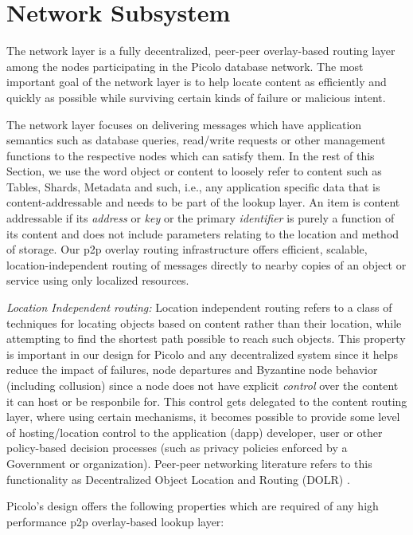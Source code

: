 \section{Network Subsystem} 

The network layer is a fully decentralized, peer-peer overlay-based routing layer among the nodes participating in the
Picolo database network. The most important goal of the network layer is to help locate content as efficiently and
quickly as possible while surviving certain kinds of failure or malicious intent.

The network layer focuses on delivering messages which have application semantics such as database queries, read/write
requests or other management functions to the respective nodes which can satisfy them. In the rest of this Section, we
use the word object or content to loosely refer to content such as Tables, Shards, Metadata and such, i.e., any
application specific data that is content-addressable and needs to be part of the lookup layer. An item is content
addressable if its {\em address} or {\em key} or the primary {\em identifier} is purely a function of its content and
does not include parameters relating to the location and method of storage. Our p2p overlay routing infrastructure offers
efficient, scalable, location-independent routing of messages directly to nearby copies of an object or service using
only localized resources.

{\em Location Independent routing:} Location independent routing refers to a class of techniques for locating objects
based on content rather than their location, while attempting to find the shortest path possible to reach such objects.
This property is important in our design for Picolo and any decentralized system since it helps reduce the impact of
failures, node departures and Byzantine node behavior (including collusion) since a node does not have explicit {\em
control} over the content it can host or be responbile for. This control gets delegated to the content routing layer,
where using certain mechanisms, it becomes possible to provide some level of hosting/location control to the application
(dapp) developer, user or other policy-based decision processes (such as privacy policies enforced by a Government or
organization).  Peer-peer networking literature refers to this functionality as Decentralized Object Location and
Routing (DOLR) \cite{dolr2003}.

Picolo's design offers the following properties which are required of any high
performance p2p overlay-based lookup layer:

